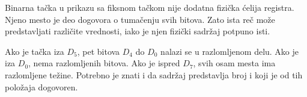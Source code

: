 
Binarna tačka u prikazu sa fiksnom tačkom nije dodatna fizička ćelija registra. Njeno mesto je deo dogovora o tumačenju svih bitova. Zato ista reč može predstavljati različite vrednosti, iako je njen fizički sadržaj potpuno isti.

Ako je tačka iza $D_5$, pet bitova $D_4$ do $D_0$ nalazi se u razlomljenom delu. Ako je iza $D_0$, nema razlomljenih bitova. Ako je ispred $D_7$, svih osam mesta ima razlomljene težine. Potrebno je znati i da sadržaj predstavlja broj i koji je od tih položaja dogovoren.
